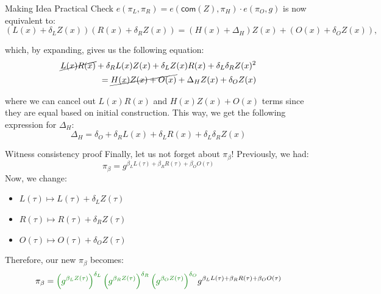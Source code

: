 \documentclass{zkdl-presentation-template}
\begin{document}
    \begin{frame}{Making Idea Practical}
        Check $e(\pi_L, \pi_R) = e(\mathsf{com}(Z), \pi_H) \cdot e(\pi_O, g)$ is now equivalent to:
        \begin{equation*}
            (L(x) + \delta_L Z(x))(R(x) + \delta_R Z(x)) = (H(x) + \Delta_H)Z(x) + (O(x) + \delta_O Z(x)),
        \end{equation*}
        
        \pause which, by expanding, gives us the following equation:
        \begin{align*}
            \cancel{L(x)R(x)} + \delta_R L(x)Z(x) + \delta_L Z(x)R(x) + \delta_L \delta_R Z(x)^2 \\= \cancel{H(x)Z(x) + O(x)} + \Delta_HZ(x) + \delta_O Z(x)
        \end{align*}
        
        \pause where we can cancel out $L(x)R(x)$ and $H(x)Z(x) + O(x)$ terms since they are equal based on initial construction. This way, we get the following expression for $\Delta_H$:
        \begin{equation*}
            \boxed{\Delta_H = \delta_O + \delta_R L(x) + \delta_L R(x) + \delta_L \delta_R Z(x)}
        \end{equation*}
    \end{frame}

    \begin{frame}{Witness consistency proof}
        Finally, let us not forget about $\pi_{\beta}$! Previously, we had:
        \begin{equation*}
            \pi_{\beta} = g^{\beta_LL(\tau) + \beta_RR(\tau) + \beta_OO(\tau)}
        \end{equation*}
        \pause Now, we change: 
        \begin{itemize}[label=]
            \item $L(\tau) \mapsto L(\tau) + \delta_L Z(\tau)$
            \item $R(\tau) \mapsto R(\tau) + \delta_R Z(\tau)$
            \item $O(\tau) \mapsto O(\tau) + \delta_O Z(\tau)$
        \end{itemize}
        
        \pause Therefore, our new $\pi_{\beta}$ becomes:
        \begin{equation*}
            \pi_{\beta} = \textcolor{green!50!black}{\left(g^{\beta_LZ(\tau)}\right)^{\delta_L}\left(g^{\beta_R Z(\tau)}\right)^{\delta_R}\left(g^{\beta_O Z(\tau)}\right)^{\delta_O}}g^{\beta_L L(\tau) + \beta_R R(\tau) + \beta_O O(\tau)}
        \end{equation*}
    \end{frame}
\end{document}
